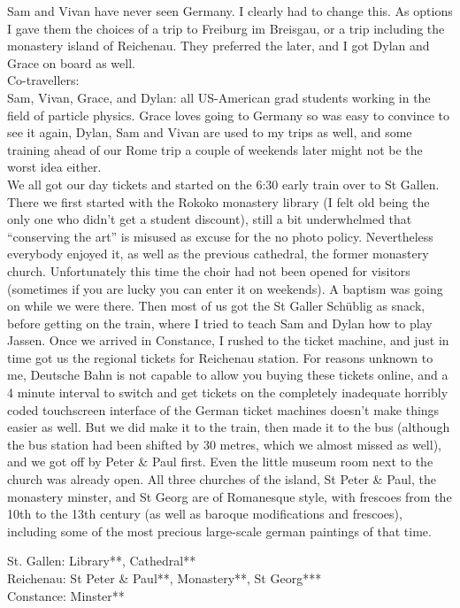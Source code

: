 Sam and Vivan have never seen Germany. I clearly had to change this. As options I gave them the choices of a trip to Freiburg im Breisgau, or a trip including the monastery island of Reichenau. They preferred the later, and I got Dylan and Grace on board as well.\\

Co-travellers:\\
Sam, Vivan, Grace, and Dylan: all US-American grad students working in the field of particle physics. Grace loves going to Germany so was easy to convince to see it again, Dylan, Sam and Vivan are used to my trips as well, and some training ahead of our Rome trip a couple of weekends later might not be the worst idea either.\\

We all got our day tickets and started on the 6:30 early train over to St Gallen. There we first started with the Rokoko monastery library (I felt old being the only one who didn't get a student discount), still a bit underwhelmed that ``conserving the art'' is misused as excuse for the no photo policy. Nevertheless everybody enjoyed it, as well as the previous cathedral, the former monastery church. Unfortunately this time the choir had not been opened for visitors (sometimes if you are lucky you can enter it on weekends). A baptism was going on while we were there. Then most of us got the St Galler Sch\"ublig as snack, before getting on the train, where I tried to teach Sam and Dylan how to play Jassen. Once we arrived in Constance, I rushed to the ticket machine, and just in time got us the regional tickets for Reichenau station. For reasons unknown to me, Deutsche Bahn is not capable to allow you buying these tickets online, and a 4 minute interval to switch and get tickets on the completely inadequate horribly coded touchscreen interface of the German ticket machines doesn't make things easier as well. But we did make it to the train, then made it to the bus (although the bus station had been shifted by 30 metres, which we almost missed as well), and we got off by Peter \& Paul first. Even the little museum room next to the church was already open. All three churches of the island, St Peter \& Paul, the monastery minster, and St Georg are of Romanesque style, with frescoes from the 10th to the 13th century (as well as baroque modifications and frescoes), including some of the most precious large-scale german paintings of that time.

St. Gallen: Library**, Cathedral**\\
Reichenau: St Peter \& Paul**, Monastery**, St Georg***\\
Constance: Minster**

